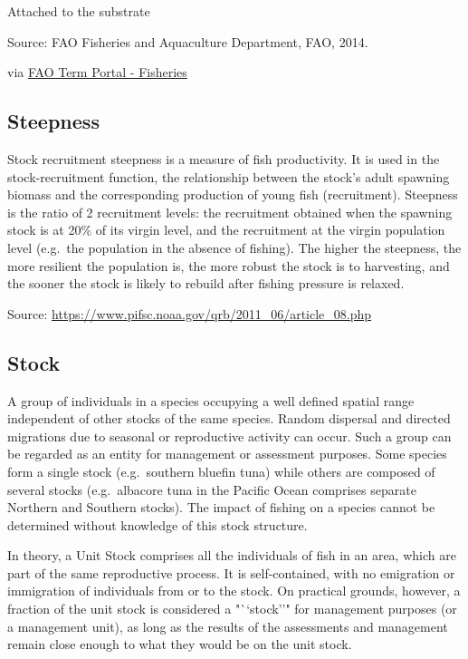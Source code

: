 \documentclass[
  11pt,
]{book}
\begin{document}
Attached to the substrate

Source: FAO Fisheries and Aquaculture Department, FAO, 2014.

via \href{http://www.fao.org/fishery/glossary/en}{FAO Term Portal - Fisheries}

\hypertarget{steepness}{%
\subsection{Steepness}\label{steepness}}

Stock recruitment steepness is a measure of fish productivity. It is used in the stock-recruitment function, the relationship between the stock's adult spawning biomass and the corresponding production of young fish (recruitment). Steepness is the ratio of 2 recruitment levels: the recruitment obtained when the spawning stock is at 20\% of its virgin level, and the recruitment at the virgin population level (e.g.~the population in the absence of fishing). The higher the steepness, the more resilient the population is, the more robust the stock is to harvesting, and the sooner the stock is likely to rebuild after fishing pressure is relaxed.

Source: \url{https://www.pifsc.noaa.gov/qrb/2011_06/article_08.php}

\hypertarget{stock}{%
\subsection{Stock}\label{stock}}

A group of individuals in a species occupying a well defined spatial range independent of other stocks of the same species. Random dispersal and directed migrations due to seasonal or reproductive activity can occur. Such a group can be regarded as an entity for management or assessment purposes. Some species form a single stock (e.g.~southern bluefin tuna) while others are composed of several stocks (e.g.~albacore tuna in the Pacific Ocean comprises separate Northern and Southern stocks). The impact of fishing on a species cannot be determined without knowledge of this stock structure.

In theory, a Unit Stock comprises all the individuals of fish in an area, which are part of the same reproductive process. It is self-contained, with no emigration or immigration of individuals from or to the stock. On practical grounds, however, a fraction of the unit stock is considered a "``stock''" for management purposes (or a management unit), as long as the results of the assessments and management remain close enough to what they would be on the unit stock.
\end{document}
